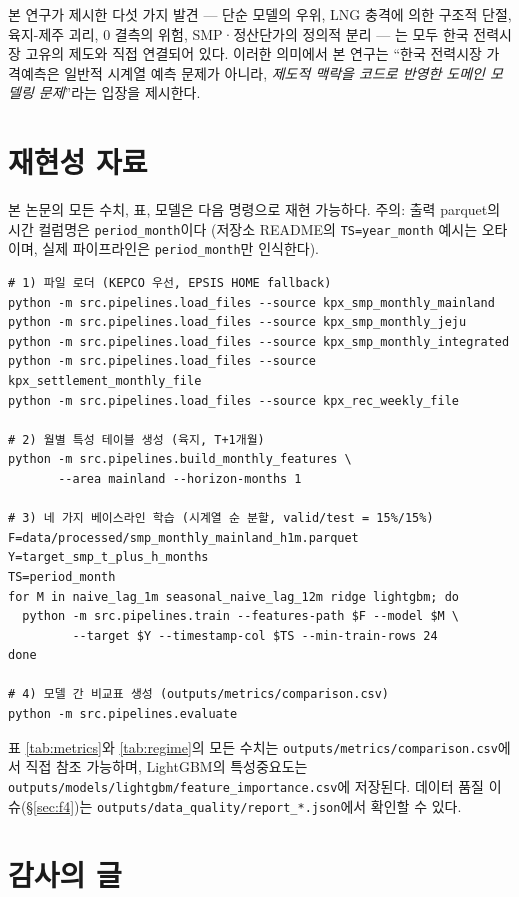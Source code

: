 \documentclass[11pt,a4paper]{article}
\begin{document}
본 연구가 제시한 다섯 가지 발견 --- 단순 모델의 우위, LNG 충격에
의한 구조적 단절, 육지-제주 괴리, 0 결측의 위험, SMP·정산단가의
정의적 분리 --- 는 모두 한국 전력시장 고유의 제도와 직접
연결되어 있다. 이러한 의미에서 본 연구는 ``한국 전력시장
가격예측은 일반적 시계열 예측 문제가 아니라, \emph{제도적
맥락을 코드로 반영한 도메인 모델링 문제}''라는 입장을 제시한다.

\section*{재현성 자료}

본 논문의 모든 수치, 표, 모델은 다음 명령으로 재현 가능하다.
주의: 출력 parquet의 시간 컬럼명은 \texttt{period\_month}이다
(저장소 README의 \texttt{TS=year\_month} 예시는 오타이며, 실제
파이프라인은 \texttt{period\_month}만 인식한다).

\begin{verbatim}
# 1) 파일 로더 (KEPCO 우선, EPSIS HOME fallback)
python -m src.pipelines.load_files --source kpx_smp_monthly_mainland
python -m src.pipelines.load_files --source kpx_smp_monthly_jeju
python -m src.pipelines.load_files --source kpx_smp_monthly_integrated
python -m src.pipelines.load_files --source kpx_settlement_monthly_file
python -m src.pipelines.load_files --source kpx_rec_weekly_file

# 2) 월별 특성 테이블 생성 (육지, T+1개월)
python -m src.pipelines.build_monthly_features \
       --area mainland --horizon-months 1

# 3) 네 가지 베이스라인 학습 (시계열 순 분할, valid/test = 15%/15%)
F=data/processed/smp_monthly_mainland_h1m.parquet
Y=target_smp_t_plus_h_months
TS=period_month
for M in naive_lag_1m seasonal_naive_lag_12m ridge lightgbm; do
  python -m src.pipelines.train --features-path $F --model $M \
         --target $Y --timestamp-col $TS --min-train-rows 24
done

# 4) 모델 간 비교표 생성 (outputs/metrics/comparison.csv)
python -m src.pipelines.evaluate
\end{verbatim}

표 \ref{tab:metrics}와 \ref{tab:regime}의 모든 수치는
\texttt{outputs/metrics/comparison.csv}에서 직접 참조 가능하며,
LightGBM의 특성중요도는 \texttt{outputs/models/lightgbm/feature\_importance.csv}에
저장된다. 데이터 품질 이슈(\S\ref{sec:f4})는
\texttt{outputs/data\_quality/report\_*.json}에서 확인할 수 있다.

\section*{감사의 글}
\end{document}
